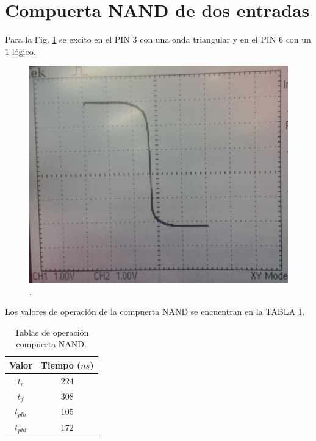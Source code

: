 \documentclass[twocolumn]{IEEEtran}
\begin{document}
\section{Compuerta NAND de dos entradas}
\noindent
Para la Fig. \ref{fig6} se excito en el PIN $3$ con una onda triangular y en el PIN $6$ con un $1$ lógico.
\begin{figure}[H]
\centering
	\includegraphics[scale=0.1]{f1.jpg}
	\caption{.}
	\label{fig6}
\end{figure}
\noindent
Los valores de operación de la compuerta NAND se encuentran en la TABLA \ref{tab3}.
\begin{table}[H]
  \centering
    \caption{Tablas de operación compuerta NAND.}
      \begin{tabular}{|c|c|}\hline
      \textbf{Valor} & \textbf{Tiempo ($ns$)} \\ \hline
      $t_r$ & $224$ \\ \hline
      $t_f$ & $308$ \\ \hline
      $t_{plh}$ & $105$ \\ \hline
      $t_{phl}$ & $172$ \\ \hline
      \end{tabular}
  \label{tab3}
\end{table}
\end{document}
